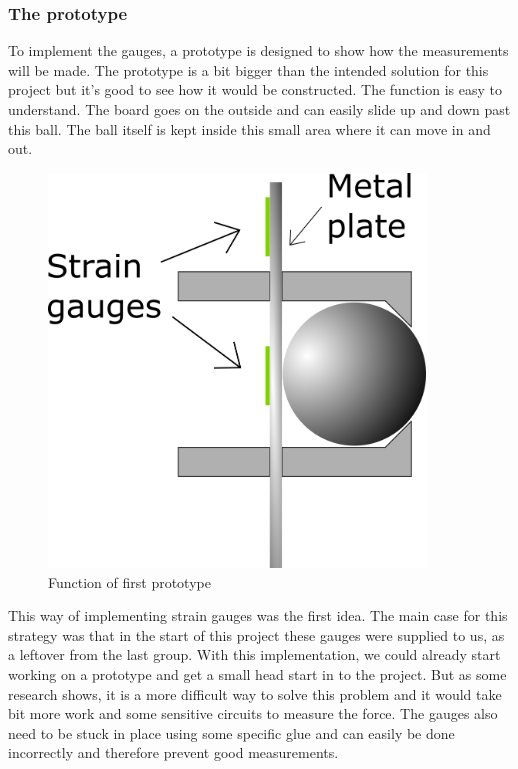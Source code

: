 \subsubsection{The prototype}%
To implement the gauges, a prototype is designed to show how the measurements will be made. The prototype is a bit bigger than the intended solution for this project but it's good to see how it would be constructed. The function is easy to understand. The board goes on the outside and can easily slide up and down past this ball.  The ball itself is kept inside this small area where it can move in and out.
 
\begin{figure}[H]%
\begin{center}
	\includegraphics[width = 10cm]{Figures/Press_sens_func_1.png}
	\caption{Function of first prototype}
	\label{Press_sens_prot_1}
\end{center}
\end{figure}

This way of implementing strain gauges was the first idea. 
The main case for this strategy was that in the start of this project these gauges were supplied to us, as a leftover from the last group. With this implementation, we could already start working on a prototype and get a small head start in to the project. But as some research shows, it is a more difficult way to solve this problem and it would take bit more work and some sensitive circuits to measure the force. The gauges also need to be stuck in place using some specific glue and can easily be done incorrectly and therefore prevent good measurements.

